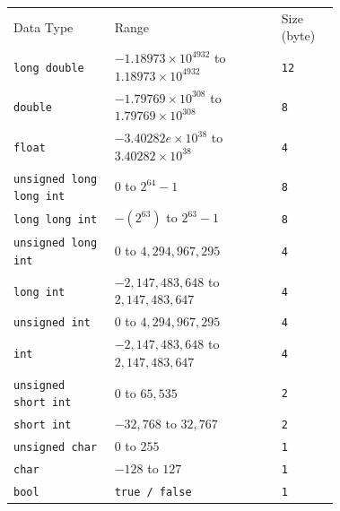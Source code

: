 \documentclass[10pt]{beamer}
\begin{document}
\begin{frame}
	\centering\scriptsize\renewcommand{\arraystretch}{1.8}
	\begin{tabular}{p{0.238\linewidth} p{0.38\linewidth} p{0.1\linewidth}}
		
		\rowcolor{cyan}\color{white} Data Type & \color{white}\centering Range & \color{white} Size (byte)\\
		
		\rowcolor{lightcyan} \texttt{long double} & \centering$-1.18973\times10^{4932}$ to $1.18973\times10^{4932}$ & \hspace{13pt}\texttt{12}\\
		\rowcolor{lightcyan} \texttt{double} & \centering$-1.79769\times10^{308}$ to $1.79769\times10^{308}$ & \hspace{16pt}\texttt{8}\\
		\rowcolor{lightcyan} \texttt{float} & \centering$-3.40282e\times10^{38}$ to $3.40282\times10^{38}$ & \hspace{16pt}\texttt{4}\\
		\rowcolor{lightcyan} \texttt{unsigned long long int} & \centering$0$ to $2^{64}-1$ & \hspace{16pt}\texttt{8}\\
		\rowcolor{lightcyan} \texttt{long long int} & \centering$-(2^{63})$ to $2^{63}-1$ & \hspace{16pt}\texttt{8}\\
		\rowcolor{lightcyan} \texttt{unsigned long int} & \centering$0$ to $4,294,967,295$ & \hspace{16pt}\texttt{4}\\
		\rowcolor{lightcyan} \texttt{long int} & \centering$-2,147,483,648$ to $2,147,483,647$ & \hspace{16pt}\texttt{4}\\
		\rowcolor{lightcyan} \texttt{unsigned int} & \centering$0$ to $4,294,967,295$ & \hspace{16pt}\texttt{4}\\
		\rowcolor{lightcyan} \texttt{int} & \centering$-2,147,483,648$ to $2,147,483,647$ & \hspace{16pt}\texttt{4}\\
		\rowcolor{lightcyan} \texttt{unsigned short int} & \centering$0$ to $65,535$ & \hspace{16pt}\texttt{2}\\
		\rowcolor{lightcyan} \texttt{short int} & \centering$-32,768$ to $32,767$ & \hspace{16pt}\texttt{2}\\
		\rowcolor{lightcyan} \texttt{unsigned char} & \centering$0$ to $255$ & \hspace{16pt}\texttt{1}\\
		\rowcolor{lightcyan} \texttt{char} & \centering$-128$ to $127$ & \hspace{16pt}\texttt{1}\\
		\rowcolor{lightcyan} \texttt{bool} & \centering\texttt{true / false} & \hspace{16pt}\texttt{1}\\
	\end{tabular}
\end{frame}
\end{document}
